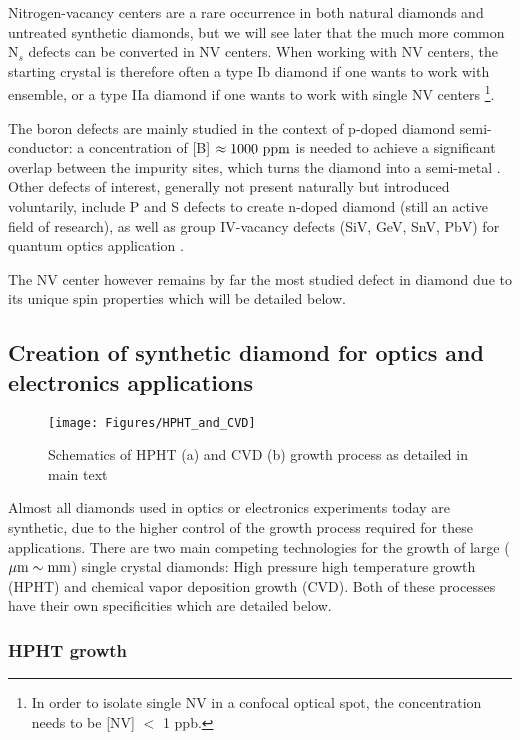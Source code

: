 \documentclass[a4paper,11pt]{report}
\begin{document}
Nitrogen-vacancy centers are a rare occurrence in both natural diamonds and untreated synthetic diamonds, but we will see later that the much more common N$_s$ defects can be converted in NV centers. When working with NV centers, the starting crystal is therefore often a type Ib diamond if one wants to work with ensemble, or a type IIa diamond if one wants to work with single NV centers \footnote{In order to isolate single NV in a confocal optical spot, the concentration needs to be [NV] $<$ 1 ppb.}.

The boron defects are mainly studied in the context of p-doped diamond semi-conductor: a concentration of [B] $\approx 1000\ \rm ppm$ is needed to achieve a significant overlap between the impurity sites, which turns the diamond into a semi-metal \citep{macpherson2015practical}. Other defects of interest, generally not present naturally but introduced voluntarily, include P and S defects to create n-doped diamond \citep{das2022diamond} (still an active field of research), as well as group IV-vacancy defects (SiV, GeV, SnV, PbV) for quantum optics application \citep{bradac2019quantum}. 

The NV center however remains by far the most studied defect in diamond due to its unique spin properties which will be detailed below.

\subsection{Creation of synthetic diamond for optics and electronics applications}
\begin{figure}[h!]
\centering
\texttt{[image: Figures/HPHT\_and\_CVD]}
\caption{Schematics of HPHT (a) and CVD (b) growth process as detailed in main text}
\label{HPHT and CVD}
\end{figure}

Almost all diamonds used in optics or electronics experiments today are synthetic, due to the higher control of the growth process required for these applications. There are two main competing technologies for the growth of large ($\mu \rm{m} \sim \rm{mm}$) single crystal diamonds: High pressure high temperature growth (HPHT) and chemical vapor deposition growth (CVD). Both of these processes have their own specificities which are detailed below.

\subsubsection{HPHT growth}
\end{document}

